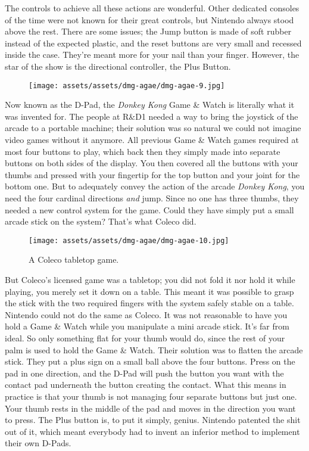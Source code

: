\documentclass{book}
\begin{document}
The controls to achieve all these actions are wonderful. Other dedicated consoles of the time were not known for their great controls, but Nintendo always stood above the rest. There are some issues; the Jump button is made of soft rubber instead of the expected plastic, and the reset buttons are very small and recessed inside the case. They’re meant more for your nail than your finger. However, the star of the show is the directional controller, the Plus Button.

\begin{figure}[hbt]
\vskip 10pt
\centering \texttt{[image: assets/assets/dmg-agae/dmg-agae-9.jpg]}
\vskip 6pt
\end{figure}

Now known as the D-Pad, the \emph{Donkey Kong} Game \& Watch is literally what it was invented for. The people at R\&D1 needed a way to bring the joystick of the arcade to a portable machine; their solution was so natural we could not imagine video games without it anymore. All previous Game \& Watch games required at most four buttons to play, which back then they simply made into separate buttons on both sides of the display. You then covered all the buttons with your thumbs and pressed with your fingertip for the top button and your joint for the bottom one. But to adequately convey the action of the arcade \emph{Donkey Kong}, you need the four cardinal directions \emph{and} jump. Since no one has three thumbs, they needed a new control system for the game. Could they have simply put a small arcade stick on the system? That’s what Coleco did.

\begin{figure}[hbt]
\vskip 10pt
\centering \texttt{[image: assets/assets/dmg-agae/dmg-agae-10.jpg]}\par\pagetwodescription A Coleco tabletop game.
\vskip 6pt
\end{figure}

But Coleco’s licensed game was a tabletop; you did not fold it nor hold it while playing, you merely set it down on a table. This meant it was possible to grasp the stick with the two required fingers with the system safely stable on a table. Nintendo could not do the same as Coleco. It was not reasonable to have you hold a Game \& Watch while you manipulate a mini arcade stick. It’s far from ideal. So only something flat for your thumb would do, since the rest of your palm is used to hold the Game \& Watch. Their solution was to flatten the arcade stick. They put a plus sign on a small ball above the four buttons. Press on the pad in one direction, and the D-Pad will push the button you want with the contact pad underneath the button creating the contact. What this means in practice is that your thumb is not managing four separate buttons but just one. Your thumb rests in the middle of the pad and moves in the direction you want to press. The Plus button is, to put it simply, genius. Nintendo patented the shit out of it, which meant everybody had to invent an inferior method to implement their own D-Pads.
\end{document}
